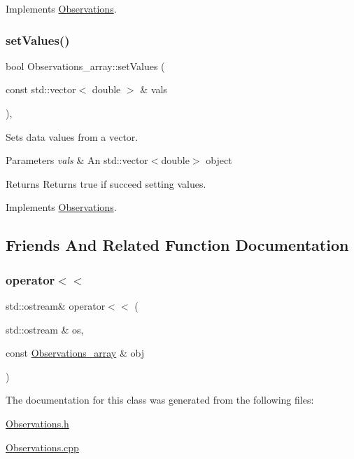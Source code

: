 Implements \mbox{\hyperlink{class_observations_a359b5b8cd97cd43483444ca4fc188dff}{Observations}}.

\mbox{\label{class_observations__array_a59ee8d2a6b0d0158a3efa7c200c8ff43}} 
\subsubsection{\texorpdfstring{set\+Values()}{setValues()}}
{\footnotesize\ttfamily bool Observations\+\_\+array\+::set\+Values (\begin{DoxyParamCaption}\item[{const std\+::vector$<$ double $>$ \&}]{vals }\end{DoxyParamCaption})\hspace{0.3cm}{\ttfamily [override]}, {\ttfamily [virtual]}}

Sets data values from a vector.


\begin{DoxyParams}{Parameters}
{\em vals} & An std\+::vector$<$double$>$ object \\
\hline
\end{DoxyParams}
\begin{DoxyReturn}{Returns}
Returns true if succeed setting values. 
\end{DoxyReturn}


Implements \mbox{\hyperlink{class_observations_a58e9bcf10981845ad5bf89b34cacdbd7}{Observations}}.



\subsection{Friends And Related Function Documentation}
\mbox{\label{class_observations__array_affb01c6a2af2ae2b833f7edec435234d}} 
\subsubsection{\texorpdfstring{operator$<$$<$}{operator<<}}
{\footnotesize\ttfamily std\+::ostream\& operator$<$$<$ (\begin{DoxyParamCaption}\item[{std\+::ostream \&}]{os,  }\item[{const \mbox{\hyperlink{class_observations__array}{Observations\+\_\+array}} \&}]{obj }\end{DoxyParamCaption})\hspace{0.3cm}{\ttfamily [friend]}}



The documentation for this class was generated from the following files\+:\begin{DoxyCompactItemize}
\item 
\mbox{\hyperlink{_observations_8h}{Observations.\+h}}\item 
\mbox{\hyperlink{_observations_8cpp}{Observations.\+cpp}}\end{DoxyCompactItemize}
